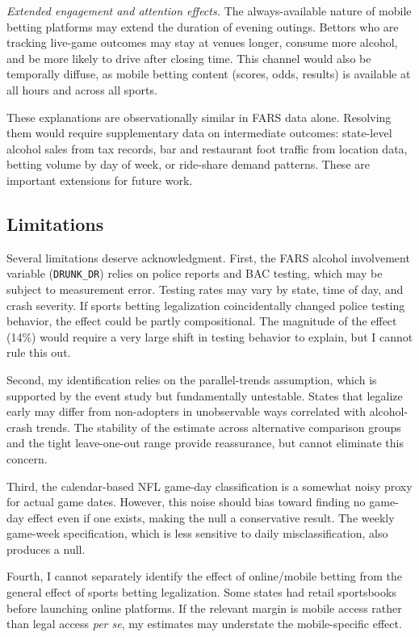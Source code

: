 \documentclass[12pt]{article}
\begin{document}
\textit{Extended engagement and attention effects.} The always-available nature of mobile betting platforms may extend the duration of evening outings. Bettors who are tracking live-game outcomes may stay at venues longer, consume more alcohol, and be more likely to drive after closing time. This channel would also be temporally diffuse, as mobile betting content (scores, odds, results) is available at all hours and across all sports.

These explanations are observationally similar in FARS data alone. Resolving them would require supplementary data on intermediate outcomes: state-level alcohol sales from tax records, bar and restaurant foot traffic from location data, betting volume by day of week, or ride-share demand patterns. These are important extensions for future work.

\subsection{Limitations}

Several limitations deserve acknowledgment. First, the FARS alcohol involvement variable (\texttt{DRUNK\_DR}) relies on police reports and BAC testing, which may be subject to measurement error. Testing rates may vary by state, time of day, and crash severity. If sports betting legalization coincidentally changed police testing behavior, the effect could be partly compositional. The magnitude of the effect (14\%) would require a very large shift in testing behavior to explain, but I cannot rule this out.

Second, my identification relies on the parallel-trends assumption, which is supported by the event study but fundamentally untestable. States that legalize early may differ from non-adopters in unobservable ways correlated with alcohol-crash trends. The stability of the estimate across alternative comparison groups and the tight leave-one-out range provide reassurance, but cannot eliminate this concern.

Third, the calendar-based NFL game-day classification is a somewhat noisy proxy for actual game dates. However, this noise should bias toward finding no game-day effect even if one exists, making the null a conservative result. The weekly game-week specification, which is less sensitive to daily misclassification, also produces a null.

Fourth, I cannot separately identify the effect of online/mobile betting from the general effect of sports betting legalization. Some states had retail sportsbooks before launching online platforms. If the relevant margin is mobile access rather than legal access \textit{per se}, my estimates may understate the mobile-specific effect.
\end{document}
